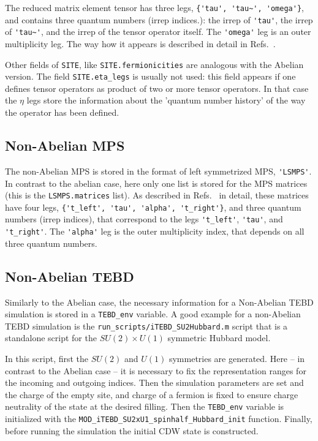 \documentclass[aps,prb,twocolumn,showpacs,preprintnumbers,amsmath,amssymb, superscriptaddressm, nofootinbib]{revtex4-2}   %
\begin{document}
The reduced matrix element tensor has three legs, \verb|{'tau', 'tau~', 'omega'}|, and contains three quantum numbers (irrep indices.): the irrep of \verb|'tau'|, the irrep of \verb|'tau~'|, and the irrep of the tensor operator itself. The \verb|'omega'| leg is an outer multiplicity leg. The way how it appears is described in detail in Refs.~. 

Other fields of \verb|SITE|, like \verb|SITE.fermionicities| are analogous with the Abelian version. The field \verb|SITE.eta_legs| is usually not used: this field appears if one defines tensor operators as product of two or more tensor operators. In that case the $\eta$ legs store the information about the 'quantum number history' of the way the operator has been defined. 

\subsection{Non-Abelian MPS}
The non-Abelian MPS is stored in the format of left symmetrized MPS, \verb|'LSMPS'|. In contrast to the abelian case, here only one list is stored for the MPS matrices (this is the \verb|LSMPS.matrices| list). As described in Refs.~ in detail, these matrices have four legs, \verb|{'t_left', 'tau', 'alpha', 't_right'}|, and three quantum numbers (irrep indices), that correspond to the legs \verb|'t_left'|, \verb|'tau'|, and \verb|'t_right'|. The \verb|'alpha'| leg is the outer multiplicity index, that depends on all three quantum numbers.


\subsection{Non-Abelian TEBD}
Similarly to the Abelian case, the necessary information for a Non-Abelian TEBD simulation is stored in a \verb|TEBD_env| variable. A good example for a non-Abelian TEBD simulation is the \verb|run_scripts/iTEBD_SU2Hubbard.m| script that is a standalone script for the $SU(2) \times U(1)$ symmetric Hubbard model.

In this script, first the $SU(2)$ and $U(1)$ symmetries are generated. Here -- in contrast to the Abelian case -- it is necessary to fix the representation ranges for the incoming and outgoing indices. Then the simulation parameters are set and the charge of the empty site, and charge of a fermion is fixed to ensure charge neutrality of the state at the desired filling. Then the \verb|TEBD_env| variable is initialized with the \verb|MOD_iTEBD_SU2xU1_spinhalf_Hubbard_init| function. Finally, before running the simulation the initial CDW state is constructed.
\end{document}
